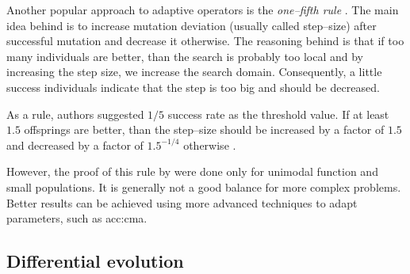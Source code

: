 Another popular approach to adaptive operators is the \emph{one--fifth rule} \citep{onefifthrule}. The main idea behind is to increase mutation deviation (usually called step--size) after successful mutation and decrease it otherwise. The reasoning behind is that if too many individuals are better, than the search is probably too local and by increasing the step size, we increase the search domain. Consequently, a little success individuals indicate that the step is too big and should be decreased.

As a rule, authors \citet*{onefifthruleoriginal} suggested $1/5$ success rate as the threshold value. If at least $1.5$ offsprings are better, than the step--size should be increased by a factor of $1.5$ and decreased by a factor of $1.5^{-1/4}$ otherwise \citep{onefifthrule}.

However, the proof of this rule by \citeauthor*{onefifthruleoriginal} were done only for unimodal function and small populations. It is generally not a good balance for more complex problems. Better results can be achieved using more advanced techniques to adapt parameters, such as \acrshort{acc:cma}.

\subsection{Differential evolution}
